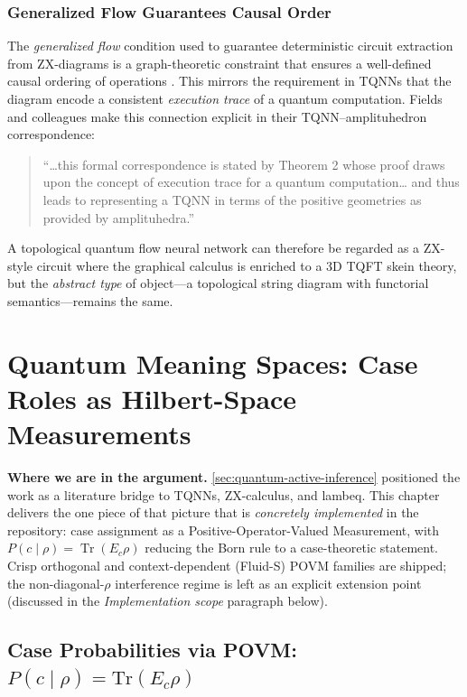 \documentclass[
]{article}
\begin{document}
\subsubsection{Generalized Flow Guarantees Causal
Order}\label{generalized-flow-guarantees-causal-order}

The \emph{generalized flow} condition used to guarantee deterministic
circuit extraction from ZX-diagrams is a graph-theoretic constraint that
ensures a well-defined causal ordering of operations
\citep{kissinger2020zx}. This mirrors the requirement in TQNNs that the
diagram encode a consistent \emph{execution trace} of a quantum
computation. Fields and colleagues make this connection explicit in
their TQNN--amplituhedron correspondence:

\begin{quote}
``\ldots this formal correspondence is stated by Theorem 2 whose proof
draws upon the concept of execution trace for a quantum
computation\ldots{} and thus leads to representing a TQNN in terms of
the positive geometries as provided by amplituhedra.''
\citep{fields2025amplituhedra}
\end{quote}

A topological quantum flow neural network can therefore be regarded as a
ZX-style circuit where the graphical calculus is enriched to a 3D TQFT
skein theory, but the \emph{abstract type} of object---a topological
string diagram with functorial semantics---remains the same.

\newpage

\section{Quantum Meaning Spaces: Case Roles as Hilbert-Space
Measurements}\label{sec:quantum-semantics}

\textbf{Where we are in the argument.}
\autoref{sec:quantum-active-inference} positioned the work as a
literature bridge to TQNNs, ZX-calculus, and lambeq. This chapter
delivers the one piece of that picture that is \emph{concretely
implemented} in the repository: case assignment as a
Positive-Operator-Valued Measurement, with
\(P(c \mid \rho) = \operatorname{Tr}(E_c \rho)\) reducing the Born rule
to a case-theoretic statement. Crisp orthogonal and context-dependent
(Fluid-S) POVM families are shipped; the non-diagonal-\(\rho\)
interference regime is left as an explicit extension point (discussed in
the \emph{Implementation scope} paragraph below).

\subsection{\texorpdfstring{Case Probabilities via POVM:
\(P(c\mid\rho)=\mathrm{Tr}(E_c\rho)\)}{Case Probabilities via POVM: P(c\textbackslash mid\textbackslash rho)=\textbackslash mathrm\{Tr\}(E\_c\textbackslash rho)}}\label{case-probabilities-via-povm-pcmidrhomathrmtre_crho}
\end{document}
